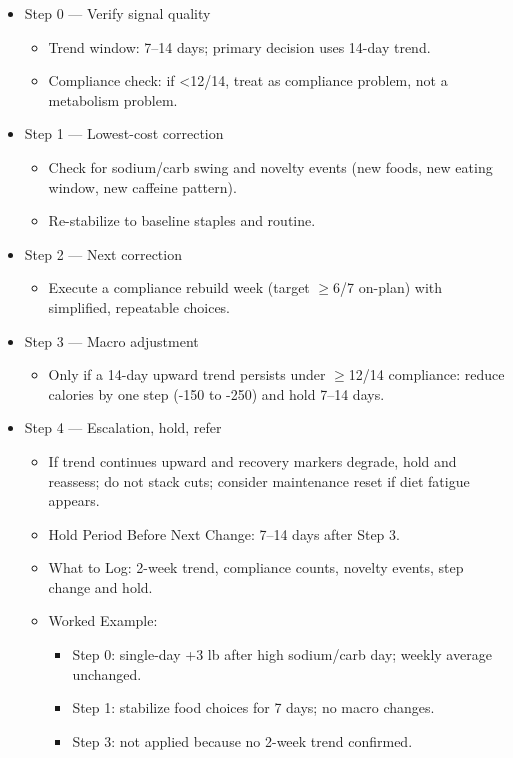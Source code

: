 \documentclass[10pt]{article}
\begin{document}
\begin{itemize}
\item Step 0 — Verify signal quality
  \begin{itemize}
  \item Trend window: 7–14 days; primary decision uses 14-day trend.
  \item Compliance check: if \textless12/14, treat as compliance problem, not a metabolism problem.
  \end{itemize}
\item Step 1 — Lowest-cost correction
  \begin{itemize}
  \item Check for sodium/carb swing and novelty events (new foods, new eating window, new caffeine pattern).
  \item Re-stabilize to baseline staples and routine.
  \end{itemize}
\item Step 2 — Next correction
  \begin{itemize}
  \item Execute a compliance rebuild week (target $\geq$6/7 on-plan) with simplified, repeatable choices.
  \end{itemize}
\item Step 3 — Macro adjustment
  \begin{itemize}
  \item Only if a 14-day upward trend persists under $\geq$12/14 compliance: reduce calories by one step (-150 to -250) and hold 7–14 days.
  \end{itemize}
\item Step 4 — Escalation, hold, refer
  \begin{itemize}
  \item If trend continues upward and recovery markers degrade, hold and reassess; do not stack cuts; consider maintenance reset if diet fatigue appears.
  \item Hold Period Before Next Change: 7–14 days after Step 3.
  \item What to Log: 2-week trend, compliance counts, novelty events, step change and hold.
  \item Worked Example:
    \begin{itemize}
    \item Step 0: single-day +3 lb after high sodium/carb day; weekly average unchanged.
    \item Step 1: stabilize food choices for 7 days; no macro changes.
    \item Step 3: not applied because no 2-week trend confirmed.
    \end{itemize}
  \end{itemize}
\end{itemize}
\end{document}
